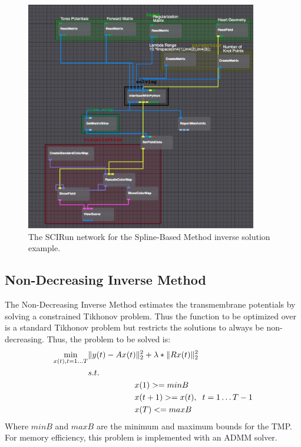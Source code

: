     \begin{figure}
        \begin{center}
        \includegraphics[width=0.9\textwidth]{ECGToolkitGuide_figures/splineInverse_Network.png}
        \caption{The SCIRun network for the Spline-Based Method inverse solution example.}
        \label{fig:splineInverse}
        \end{center}
    \end{figure}
    
    

\subsection{Non-Decreasing Inverse Method}

    The Non-Decreasing Inverse Method estimates the transmembrane potentials by solving a constrained Tikhonov problem.
    Thus the function to be optimized over is a standard Tikhonov problem but restricts the solutions to always be non-decreasing.
    Thus, the problem to be solved is:
    \begin{equation}\begin{split}
    		\min_{x(t), t=1\dots T} &\|y(t) - Ax(t)\|_2^2 + \lambda*\|Rx(t)\|_2^2 \\
    		&s.t.\\
      		&\hspace{2cm}x(1) >= minB\\
         	&\hspace{2cm}x(t+1) >= x(t), \hspace{.2cm}t=1\dots T-1\\
         	&\hspace{2cm}x(T) <= maxB
    \end{split}
    \end{equation}
    Where $minB$ and $maxB$ are the minimum and maximum bounds for the TMP.
    For memory efficiency, this problem is implemented with an ADMM solver.
    

